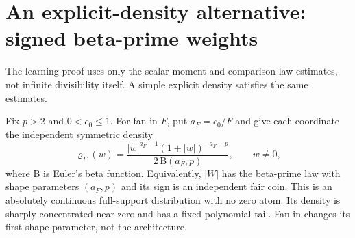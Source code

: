\section{An explicit-density alternative: signed beta-prime weights}
\label{sec:beta-prime}
The learning proof uses only the scalar moment and comparison-law estimates, not infinite divisibility itself. A simple explicit density satisfies the same estimates.

Fix $p>2$ and $0<c_0\le1$. For fan-in $F$, put $a_F=c_0/F$ and give each coordinate the independent symmetric density
\begin{equation}
 \varrho_F(w)=
 \frac{|w|^{a_F-1}(1+|w|)^{-a_F-p}}
      {2\,\mathrm B(a_F,p)},\qquad w\ne0,
 \label{eq:beta-prime-prior}
\end{equation}
where $\mathrm B$ is Euler's beta function. Equivalently, $|W|$ has the beta-prime law with shape parameters $(a_F,p)$ and its sign is an independent fair coin. This is an absolutely continuous full-support distribution with no zero atom. Its density is sharply concentrated near zero and has a fixed polynomial tail. Fan-in changes its first shape parameter, not the architecture.


